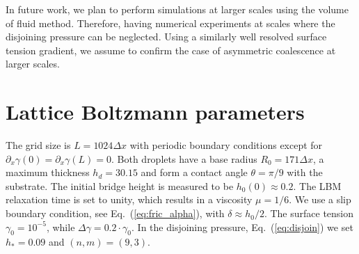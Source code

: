 \documentclass[twocolumn,amsmath,amssymb,showpacs,pre,nofootinbib,superscriptaddress]{revtex4-1} %
\begin{document}
In future work, we plan to perform simulations at larger scales using the volume of fluid method.
Therefore, having numerical experiments at scales where the disjoining pressure can be neglected.
Using a similarly well resolved surface tension gradient, we assume to confirm the case of asymmetric coalescence at larger scales.

\begin{acknowledgements}

\end{acknowledgements}


%

\appendix
\section{Lattice Boltzmann parameters}\label{app:one}


The grid size is $L=1024\Delta x$ with periodic boundary conditions except for $\partial_x\gamma(0) = \partial_x\gamma(L) = 0$.
Both droplets have a base radius $R_0 = 171\Delta x$, a maximum thickness $h_d = 30.15$ and form a contact angle $\theta = \pi/9$ with the substrate.
The initial bridge height is measured to be $h_0(0) \approx 0.2$.
The LBM relaxation time is set to unity, which results in a viscosity $\mu = 1/6$. 
We use a slip boundary condition, see Eq.~(\ref{eq:fric_alpha}), with $\delta \approx h_0/2$.
The surface tension $\gamma_0 = 10^{-5}$, while $\Delta\gamma = 0.2\cdot \gamma_0$.
In the disjoining pressure, Eq.~(\ref{eq:disjoin}) we set $h_{\ast} = 0.09$ and $(n,m) = (9,3)$.


\end{document}
